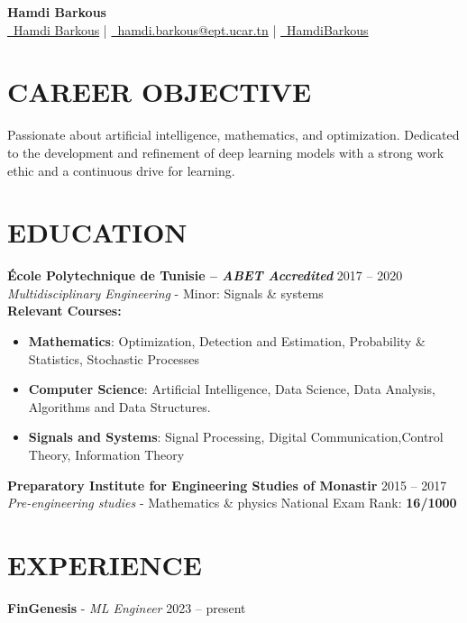 \documentclass[a4paper,9pt]{extarticle}
\begin{document}
\pagestyle{empty}

\begin{center}
\textbf{\huge Hamdi Barkous}\\[2pt] %
\href{https://github.com/HamdiBarkous}{\faGithub\ Hamdi Barkous}
 | \href{mailto:hamdi.barkous@ept.ucar.tn}{\faEnvelopeO\ hamdi.barkous@ept.ucar.tn}
 | \href{https://www.linkedin.com/in/HamdiBarkous}{\faLinkedin\ HamdiBarkous}
\end{center}

\section*{CAREER OBJECTIVE}
Passionate about artificial intelligence, mathematics, and optimization. Dedicated to the development and refinement of deep learning models with a strong work ethic and a continuous drive for learning.

\section*{EDUCATION}
\textbf{École Polytechnique de Tunisie -- \textit{ABET Accredited}}
\hfill 2017 -- 2020\\ 
\textit{Multidisciplinary Engineering} - Minor: Signals \& systems \\
\textbf{Relevant Courses:}
\begin{itemize}
            \item \textbf{Mathematics}: Optimization, Detection and Estimation, Probability \& Statistics, Stochastic Processes
            \item \textbf{ Computer Science}: Artificial Intelligence, Data Science, Data Analysis, Algorithms and Data Structures.
            \item \textbf{Signals and Systems}: Signal Processing, Digital Communication,Control Theory,  Information Theory
\end{itemize}
\textbf{Preparatory Institute for Engineering Studies of Monastir} \hfill 2015 -- 2017\\
\textit{Pre-engineering studies} - Mathematics \& physics \hfill National Exam Rank: \textbf{16/1000}\\

\section*{EXPERIENCE}
\textbf{FinGenesis} - \textit{ML Engineer} \hfill 2023 -- present 
\end{document}
